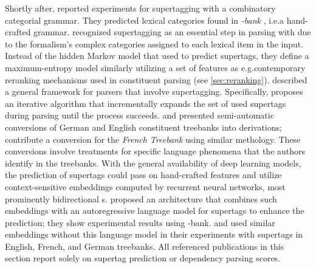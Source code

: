 \documentclass[../document.tex]{subfiles}
\begin{document}
    Shortly after, \citet{clark2002supertagging} reported experiments for supertagging with a combinatory categorial grammar.
    They predicted lexical categories found in \emph{-bank} \citep{Hoc07}, i.e.\@ a hand-crafted grammar.
     recognized supertagging as an essential step in parsing with  due to the formalism's complex categories assigned to each lexical item in the input.
    Instead of the hidden Markov model that \citet{bangalore1999supertagging} used to predict supertags, they define a maximum-entropy model similarly utilizing a set of features as e.g.\@ contemporary reranking mechanisms used in constituent parsing (see \cref{sec:reranking}).
     described a general framework for parsers that involve supertagging.
    Specifically, \citeauthor{Auli12} proposes an iterative algorithm that incrementally expands the set of used supertags during parsing until the process succeeds.
     and \citet{Kaeshammer2012GermanAE} presented semi-automatic conversions of German and English constituent treebanks into  derivations; \citet{Bla18} contribute a conversion for the \emph{French Treebank} \citep{abeille2003building} using similar methology.
    These conversions involve treatments for specific language phenomena that the authors identify in the treebanks.
    With the general availability of deep learning models, the prediction of supertags could pass on hand-crafted features and utilize context-sensitive embeddings computed by recurrent neural networks, most prominently bidirectional s.
     proposed an architecture that combines such embeddings with an autoregressive language model for supertags to enhance the prediction; they show experimental results using -bank.
     and \citet{Bla18} used similar embeddings without this language model in their experiments with  supertags in English, French, and German treebanks.
    All referenced publications in this section report solely on supertag prediction or dependency parsing scores.

    \ifSubfilesClassLoaded{%
        \printindex
    }{}
\end{document}
